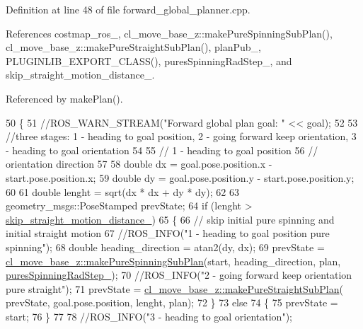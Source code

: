 Definition at line 48 of file forward\+\_\+global\+\_\+planner.\+cpp.



References costmap\+\_\+ros\+\_\+, cl\+\_\+move\+\_\+base\+\_\+z\+::make\+Pure\+Spinning\+Sub\+Plan(), cl\+\_\+move\+\_\+base\+\_\+z\+::make\+Pure\+Straight\+Sub\+Plan(), plan\+Pub\+\_\+, P\+L\+U\+G\+I\+N\+L\+I\+B\+\_\+\+E\+X\+P\+O\+R\+T\+\_\+\+C\+L\+A\+S\+S(), pures\+Spinning\+Rad\+Step\+\_\+, and skip\+\_\+straight\+\_\+motion\+\_\+distance\+\_\+.



Referenced by make\+Plan().


\begin{DoxyCode}
50 \{
51     \textcolor{comment}{//ROS\_WARN\_STREAM("Forward global plan goal: " << goal);}
52 
53     \textcolor{comment}{//three stages: 1 - heading to goal position, 2 - going forward keep orientation, 3 - heading to goal
       orientation}
54 
55     \textcolor{comment}{// 1 - heading to goal position}
56     \textcolor{comment}{// orientation direction}
57 
58     \textcolor{keywordtype}{double} dx = goal.pose.position.x - start.pose.position.x;
59     \textcolor{keywordtype}{double} dy = goal.pose.position.y - start.pose.position.y;
60 
61     \textcolor{keywordtype}{double} lenght = sqrt(dx * dx + dy * dy);
62 
63     geometry\_msgs::PoseStamped prevState;
64     \textcolor{keywordflow}{if} (lenght > \hyperlink{classcl__move__base__z_1_1forward__global__planner_1_1ForwardGlobalPlanner_abafd101fa62caf2d74f118a0b4bb948c}{skip\_straight\_motion\_distance\_})
65     \{
66         \textcolor{comment}{// skip initial pure spinning and initial straight motion}
67         \textcolor{comment}{//ROS\_INFO("1 - heading to goal position pure spinning");}
68         \textcolor{keywordtype}{double} heading\_direction = atan2(dy, dx);
69         prevState = \hyperlink{namespacecl__move__base__z_ac774e138510eb7b5e0015be1f7709e19}{cl\_move\_base\_z::makePureSpinningSubPlan}(start, 
      heading\_direction, plan, \hyperlink{classcl__move__base__z_1_1forward__global__planner_1_1ForwardGlobalPlanner_a6aed6f8f6e57a8c5821977814d0b9402}{puresSpinningRadStep\_});
70         \textcolor{comment}{//ROS\_INFO("2 - going forward keep orientation pure straight");}
71         prevState = \hyperlink{namespacecl__move__base__z_a1d6998cc28a1847906272f2bf92bacc8}{cl\_move\_base\_z::makePureStraightSubPlan}(
      prevState, goal.pose.position, lenght, plan);
72     \}
73     \textcolor{keywordflow}{else}
74     \{
75         prevState = start;
76     \}
77 
78     \textcolor{comment}{//ROS\_INFO("3 - heading to goal orientation");}

\end{DoxyCode}
